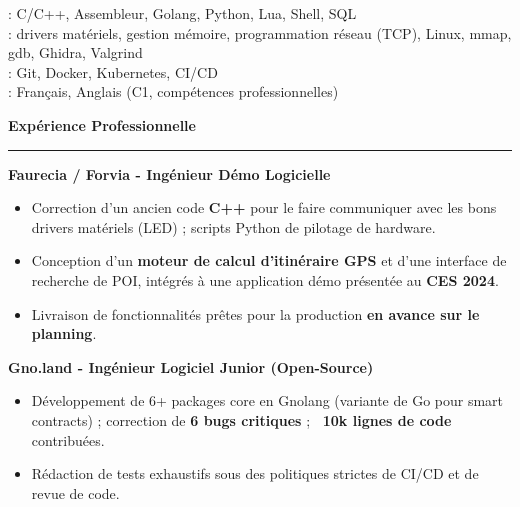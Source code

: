 \documentclass[9pt]{extarticle}
\begin{document}
\hspace*{5pt}{\bfseries Maîtrise}: C/C++, Assembleur, Golang, Python, Lua, Shell, SQL
\\
\hspace*{5pt}{\bfseries Embarqué \& Systèmes}: drivers matériels, gestion mémoire, programmation réseau (TCP), Linux, mmap, gdb, Ghidra, Valgrind
\\
\hspace*{5pt}{\bfseries Outils}: Git, Docker, Kubernetes, CI/CD
\\
\hspace*{5pt}{\bfseries Langues}: Français, Anglais (C1, compétences professionnelles)

\par\vspace{5pt}

{\large\bfseries Expérience Professionnelle}
\par\vspace{-8pt}
\rule{\linewidth}{0.4pt}
\par\vspace{5pt}

{\bfseries Faurecia / Forvia - Ingénieur Démo Logicielle}
\begin{itemize}[noitemsep, topsep=0pt]
	\item Correction d'un ancien code {\bfseries C++} pour le faire communiquer avec les bons drivers matériels (LED) ; scripts Python de pilotage de hardware.
	\item Conception d'un {\bfseries moteur de calcul d'itinéraire GPS} et d'une interface de recherche de POI, intégrés à une application démo présentée au {\bfseries CES 2024}.
	\item Livraison de fonctionnalités prêtes pour la production {\bfseries en avance sur le planning}.
\end{itemize}

\par\vspace{5pt}

{\bfseries Gno.land - Ingénieur Logiciel Junior (Open-Source)}
\begin{itemize}[noitemsep, topsep=0pt]
	\item Développement de 6+ packages core en Gnolang (variante de Go pour smart contracts) ; correction de {\bfseries 6 bugs critiques} ; {\bfseries ~10k lignes de code} contribuées.
	\item Rédaction de tests exhaustifs sous des politiques strictes de CI/CD et de revue de code.
\end{itemize}
\end{document}
